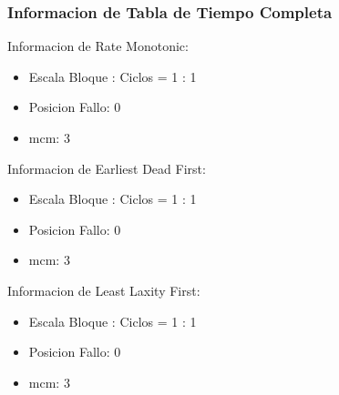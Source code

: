 \documentclass[xcolor=table]{beamer}
\begin{document}
\begin{frame} 
\frametitle{Informacion de Tabla de Tiempo Completa} 
Informacion de Rate Monotonic:\\ 
\begin{itemize} 
\item Escala Bloque : Ciclos = 1 : 1 \\ 
\item Posicion Fallo:  0 \\ 
\item mcm:  3 \\ 
\end{itemize} 
Informacion de Earliest Dead First:\\ 
\begin{itemize} 
\item Escala Bloque : Ciclos = 1 : 1 \\ 
\item Posicion Fallo:  0 \\ 
\item mcm:  3 \\ 
\end{itemize} 
Informacion de Least Laxity First:\\ 
\begin{itemize} 
\item Escala Bloque : Ciclos = 1 : 1 \\ 
\item Posicion Fallo:  0 \\ 
\item mcm:  3 \\ 
\end{itemize} 
\end{frame} 

\end{document}
